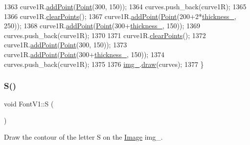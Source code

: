 \begin{DoxyCode}
1363     curve1R.\mbox{\hyperlink{class_bezier_curve_a38d16c18b36ae45619b05e26e226cf34}{addPoint}}(\mbox{\hyperlink{class_point}{Point}}(300, 150));
1364     curves.push\_back(curve1R);
1365 
1366     curve1R.\mbox{\hyperlink{class_bezier_curve_a0ba8ce66d5af5971ae6a1b506029728e}{clearPoints}}();
1367     curve1R.\mbox{\hyperlink{class_bezier_curve_a38d16c18b36ae45619b05e26e226cf34}{addPoint}}(\mbox{\hyperlink{class_point}{Point}}(200+2*\mbox{\hyperlink{class_font_v1_aed8040e76be9a52833627b92f0fb4e5f}{thickness\_}}, 250));
1368     curve1R.\mbox{\hyperlink{class_bezier_curve_a38d16c18b36ae45619b05e26e226cf34}{addPoint}}(\mbox{\hyperlink{class_point}{Point}}(300+\mbox{\hyperlink{class_font_v1_aed8040e76be9a52833627b92f0fb4e5f}{thickness\_}}, 150));
1369     curves.push\_back(curve1R);
1370 
1371     curve1R.\mbox{\hyperlink{class_bezier_curve_a0ba8ce66d5af5971ae6a1b506029728e}{clearPoints}}();
1372     curve1R.\mbox{\hyperlink{class_bezier_curve_a38d16c18b36ae45619b05e26e226cf34}{addPoint}}(\mbox{\hyperlink{class_point}{Point}}(300, 150));
1373     curve1R.\mbox{\hyperlink{class_bezier_curve_a38d16c18b36ae45619b05e26e226cf34}{addPoint}}(\mbox{\hyperlink{class_point}{Point}}(300+\mbox{\hyperlink{class_font_v1_aed8040e76be9a52833627b92f0fb4e5f}{thickness\_}}, 150));
1374     curves.push\_back(curve1R);
1375 
1376     \mbox{\hyperlink{class_font_v1_a00569e3e3c4b70f437b63f396f735fb0}{img\_}}.\mbox{\hyperlink{class_image_a8d162f3cab956131d58708c09aa560b0}{draw}}(curves);
1377 \}
\end{DoxyCode}
\mbox{\label{class_font_v1_ab6daa08377051d5af458003c665cfc09}} 
\subsubsection{\texorpdfstring{S()}{S()}}
{\footnotesize\ttfamily void Font\+V1\+::S (\begin{DoxyParamCaption}{ }\end{DoxyParamCaption})}



Draw the contour of the letter S on the \mbox{\hyperlink{class_image}{Image}} img\+\_\+. 



